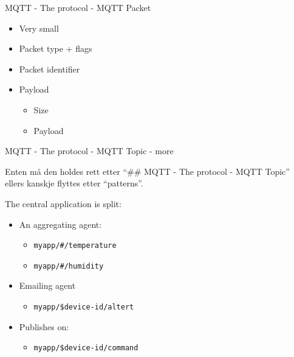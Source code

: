 \begin{frame}{MQTT - The protocol - MQTT Packet}
\protect\hypertarget{mqtt---the-protocol---mqtt-packet}{}

\begin{itemize}
\tightlist
\item
  Very small
\end{itemize}

\begin{itemize}
\tightlist
\item
  Packet type + flags
\item
  Packet identifier
\item
  Payload

  \begin{itemize}
  \tightlist
  \item
    Size
  \item
    Payload
  \end{itemize}
\end{itemize}


\end{frame}

\begin{frame}[fragile]{MQTT - The protocol - MQTT Topic - more}
\protect\hypertarget{mqtt---the-protocol---mqtt-topic---more}{}

Enten må den holdes rett etter “\#\# MQTT - The protocol - MQTT Topic”
ellers kanskje flyttes etter “patterns”.

The central application is split:

\begin{itemize}
\tightlist
\item
  An aggregating agent:

  \begin{itemize}
  \tightlist
  \item
    \texttt{myapp/\#/temperature}
  \item
    \texttt{myapp/\#/humidity}
  \end{itemize}
\item
  Emailing agent

  \begin{itemize}
  \tightlist
  \item
    \texttt{myapp/\$device-id/altert}
  \end{itemize}
\item
  Publishes on:

  \begin{itemize}
  \tightlist
  \item
    \texttt{myapp/\$device-id/command}
  \end{itemize}
\end{itemize}

\note{}

\end{frame}

